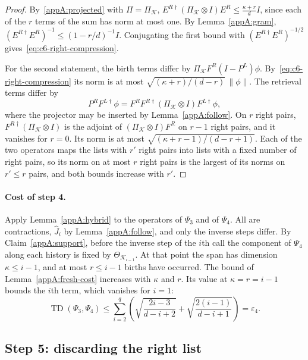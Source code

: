 \documentclass[11pt,letterpaper]{article}
\theoremstyle{definition}\newtheorem{definition}[theorem]{Definition}
\newcommand{\TD}{\operatorname{TD}}
\newcommand{\norm}[1]{\lVert#1\rVert}
\begin{document}
\begin{proof}
By~\eqref{appA:projected} with $\Pi=\Pi_{\mathcal K}$,
$E^{R\dagger}(\Pi_{\mathcal K}\otimes I)E^R\le\frac{\kappa+r}{d}I$,
since each of the $r$ terms of the sum has norm at most one. By
Lemma~\ref{appA:gram}, $(E^{R\dagger}E^R)^{-1}\le(1-r/d)^{-1}I$.
Conjugating the first bound with $(E^{R\dagger}E^R)^{-1/2}$
gives~\eqref{eq:c6-right-compression}.

For the second statement, the birth terms differ by
$\Pi_{\mathcal K}F^R(I-P^L)\phi$.
By~\eqref{eq:c6-right-compression} its norm is at most
$\sqrt{(\kappa+r)/(d-r)}\,\norm\phi$. The retrieval terms differ by
\[
 P^RF^{L\dagger}\phi
 =F^RF^{R\dagger}(\Pi_{\mathcal K}\otimes I)F^{L\dagger}\phi ,
\]
where the projector may be inserted by Lemma~\ref{appA:follow}. On
$r$ right pairs,
$F^{R\dagger}(\Pi_{\mathcal K}\otimes I)$ is the adjoint of
$(\Pi_{\mathcal K}\otimes I)F^R$ on $r-1$ right pairs, and it vanishes
for $r=0$. Its norm is at most $\sqrt{(\kappa+r-1)/(d-r+1)}$. Each of
the two operators maps the lists with $r'$ right pairs into lists with
a fixed number of right pairs, so its norm on at most $r$ right pairs
is the largest of its norms on $r'\le r$ pairs, and both bounds
increase with $r'$.
\end{proof}

\paragraph{Cost of step 4.}
Apply Lemma~\ref{appA:hybrid} to the operators of $\Psi_3$ and of
$\Psi_4$. All are contractions, $\widehat J_i$ by
Lemma~\ref{appA:follow}, and only the inverse steps differ. By
Claim~\ref{appA:support}, before the inverse step of the $i$th
call the component of
$\Psi_4$ along each history is fixed by $\Theta_{\mathcal K_{i-1}}$.
At that point the span has dimension $\kappa\le i-1$,
and at most $r\le i-1$ births have occurred. The bound of
Lemma~\ref{appA:fresh-cost} increases with $\kappa$ and $r$. Its
value at $\kappa=r=i-1$ bounds the $i$th term, which vanishes for
$i=1$:
\begin{equation}\label{eq:c6-B}
 \TD(\Psi_3,\Psi_4)\le
 \sum_{i=2}^q\left(
       \sqrt{\frac{2i-3}{d-i+2}}
       +\sqrt{\frac{2(i-1)}{d-i+1}}\right)=\varepsilon_4.
\end{equation}

\subsection{Step 5: discarding the right list}\label{sec:c6-A4}
\end{document}
